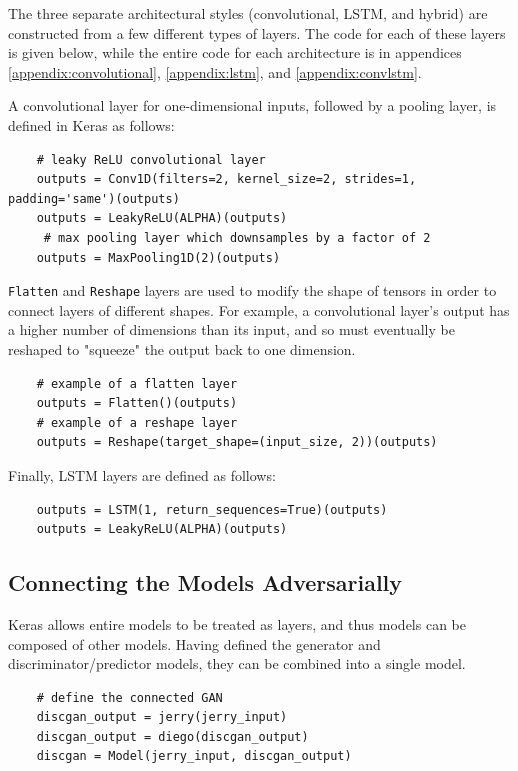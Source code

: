 \documentclass[12pt, titlepage]{report}
\theoremstyle{definition}
\begin{document}
The three separate architectural styles (convolutional, LSTM, and hybrid) are constructed from a few different types of layers. The code for each of these layers is given below, while the entire code for each architecture is in appendices \ref{appendix:convolutional}, \ref{appendix:lstm}, and \ref{appendix:convlstm}.

A convolutional layer for one-dimensional inputs, followed by a pooling layer, is defined in Keras as follows:

\begin{verbatim}
    # leaky ReLU convolutional layer
    outputs = Conv1D(filters=2, kernel_size=2, strides=1, padding='same')(outputs)
    outputs = LeakyReLU(ALPHA)(outputs)
     # max pooling layer which downsamples by a factor of 2
    outputs = MaxPooling1D(2)(outputs)
\end{verbatim}

\texttt{Flatten} and \texttt{Reshape} layers are used to modify the shape of tensors in order to connect layers of different shapes. For example, a convolutional layer's output has a higher number of dimensions than its input, and so must eventually be reshaped to "squeeze" the output back to one dimension.

\begin{verbatim}
    # example of a flatten layer
    outputs = Flatten()(outputs)
    # example of a reshape layer
    outputs = Reshape(target_shape=(input_size, 2))(outputs)
\end{verbatim}

Finally, LSTM layers are defined as follows:

\begin{verbatim}
    outputs = LSTM(1, return_sequences=True)(outputs)
    outputs = LeakyReLU(ALPHA)(outputs)
\end{verbatim}



\subsection{Connecting the Models Adversarially}
Keras allows entire models to be treated as layers, and thus models can be composed of other models. Having defined the generator and discriminator/predictor models, they can be combined into a single model.

\begin{verbatim}
    # define the connected GAN
    discgan_output = jerry(jerry_input)
    discgan_output = diego(discgan_output)
    discgan = Model(jerry_input, discgan_output)
\end{verbatim}
\end{document}
